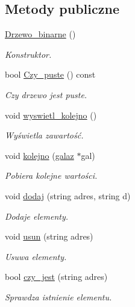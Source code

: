 \subsection*{\-Metody publiczne}
\begin{DoxyCompactItemize}
\item 
\hyperlink{class_drzewo__binarne_a9a57a4711e635e2eb9032b6619ce63fb}{\-Drzewo\-\_\-binarne} ()
\begin{DoxyCompactList}\small\item\em \-Konstruktor. \end{DoxyCompactList}\item 
bool \hyperlink{class_drzewo__binarne_aa9e767a3f55ca4d93e5eab7d8d27633d}{\-Czy\-\_\-puste} () const 
\begin{DoxyCompactList}\small\item\em \-Czy drzewo jest puste. \end{DoxyCompactList}\item 
void \hyperlink{class_drzewo__binarne_a2afc7a05aa63660125f5677c3aa5cfe5}{wyswietl\-\_\-kolejno} ()
\begin{DoxyCompactList}\small\item\em \-Wyświetla zawartość. \end{DoxyCompactList}\item 
void \hyperlink{class_drzewo__binarne_a67ce1de738303b5e88c0771cd4aabe1f}{kolejno} (\hyperlink{struct_drzewo__binarne_1_1galaz}{galaz} $\ast$gal)
\begin{DoxyCompactList}\small\item\em \-Pobiera kolejne wartości. \end{DoxyCompactList}\item 
void \hyperlink{class_drzewo__binarne_a760bf194d205fc3e2f3fbadf15239e27}{dodaj} (string adres, string d)
\begin{DoxyCompactList}\small\item\em \-Dodaje elementy. \end{DoxyCompactList}\item 
void \hyperlink{class_drzewo__binarne_a67361052da854238bd9113e5a88bd184}{usun} (string adres)
\begin{DoxyCompactList}\small\item\em \-Usuwa elementy. \end{DoxyCompactList}\item 
bool \hyperlink{class_drzewo__binarne_abcb8fc1deadbc07c98e21edb46b80cea}{czy\-\_\-jest} (string adres)
\begin{DoxyCompactList}\small\item\em \-Sprawdza istnienie elementu. \end{DoxyCompactList}\end{DoxyCompactItemize}

